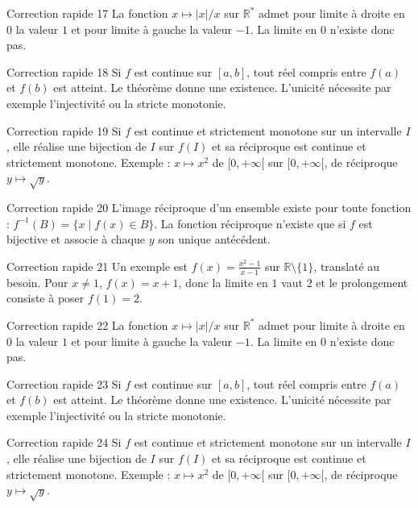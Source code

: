 \documentclass[11pt,a4paper]{article}
\newcommand{\R}{\mathbb{R}}
\begin{document}
\begin{corrbox}{Correction rapide 17}
La fonction $x\mapsto |x|/x$ sur $\R^*$ admet pour limite à droite en $0$ la valeur $1$ et pour limite à gauche la valeur $-1$. La limite en $0$ n'existe donc pas.
\end{corrbox}
\begin{corrbox}{Correction rapide 18}
Si $f$ est continue sur $[a,b]$, tout réel compris entre $f(a)$ et $f(b)$ est atteint. Le théorème donne une existence. L'unicité nécessite par exemple l'injectivité ou la stricte monotonie.
\end{corrbox}
\begin{corrbox}{Correction rapide 19}
Si $f$ est continue et strictement monotone sur un intervalle $I$, elle réalise une bijection de $I$ sur $f(I)$ et sa réciproque est continue et strictement monotone. Exemple : $x\mapsto x^2$ de $[0,+\infty[$ sur $[0,+\infty[$, de réciproque $y\mapsto\sqrt y$.
\end{corrbox}
\begin{corrbox}{Correction rapide 20}
L'image réciproque d'un ensemble existe pour toute fonction : $f^{-1}(B)=\{x\mid f(x)\in B\}$. La fonction réciproque n'existe que si $f$ est bijective et associe à chaque $y$ son unique antécédent.
\end{corrbox}
\begin{corrbox}{Correction rapide 21}
Un exemple est $f(x)=\frac{x^2-1}{x-1}$ sur $\R\setminus\{1\}$, translaté au besoin. Pour $x\neq1$, $f(x)=x+1$, donc la limite en $1$ vaut $2$ et le prolongement consiste à poser $f(1)=2$.
\end{corrbox}
\begin{corrbox}{Correction rapide 22}
La fonction $x\mapsto |x|/x$ sur $\R^*$ admet pour limite à droite en $0$ la valeur $1$ et pour limite à gauche la valeur $-1$. La limite en $0$ n'existe donc pas.
\end{corrbox}
\begin{corrbox}{Correction rapide 23}
Si $f$ est continue sur $[a,b]$, tout réel compris entre $f(a)$ et $f(b)$ est atteint. Le théorème donne une existence. L'unicité nécessite par exemple l'injectivité ou la stricte monotonie.
\end{corrbox}
\begin{corrbox}{Correction rapide 24}
Si $f$ est continue et strictement monotone sur un intervalle $I$, elle réalise une bijection de $I$ sur $f(I)$ et sa réciproque est continue et strictement monotone. Exemple : $x\mapsto x^2$ de $[0,+\infty[$ sur $[0,+\infty[$, de réciproque $y\mapsto\sqrt y$.
\end{corrbox}
\end{document}
